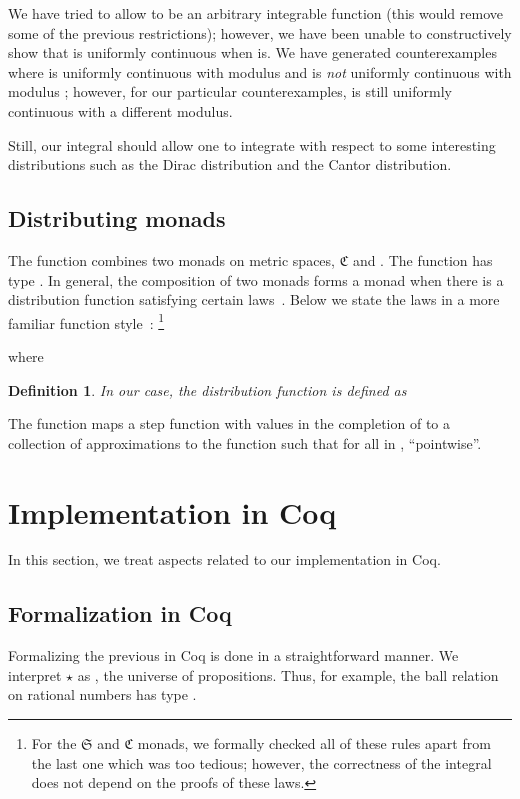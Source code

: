 \documentclass{elsarticle}
\newcommand{\op}[1]{#1}
\newcommand{\tmem}[1]{{\em #1\/}}
\newcommand{\tmtexttt}[1]{{\ttfamily{#1}}}
\newtheorem{definition}{Definition}
\newcommand{\C}{\ensuremath{\mathfrak{C}}}
\newcommand{\Prop}{\ensuremath{\op{\star}}}
\newcommand{\SF}{\ensuremath{\mathfrak{S}}}
\begin{document}
We have tried to allow  to be an arbitrary integrable function (this would
remove some of the previous restrictions); however, we have been unable to
constructively show that 
is uniformly continuous when  is. We have generated counterexamples where
 is uniformly continuous with modulus  and  is {\tmem{not}} uniformly continuous with
modulus ; however, for our particular counterexamples,
 is still uniformly
continuous with a different modulus.

Still, our integral should allow one to integrate with respect to some
interesting distributions such as the Dirac distribution
and the Cantor distribution.

\subsection{Distributing monads}\label{ss:dist-monad}The function
 combines two monads on metric
spaces, {\C} and
. The function  has type . In general, the composition of two monads
 forms a monad when there is a distribution
function  satisfying certain laws~{\cite{Beck:1969,TTT}}.
Below we state the laws in a more familiar function style~{\cite{Jones:1993}}:
{\footnote{For the {\SF} and {\C} monads, we formally checked all of these
rules apart from the last one which was too tedious; however, the correctness
of the integral does not depend on the proofs of these laws.}}

where

\begin{definition}
  \label{StepDist}In our case, the distribution function is defined as
  
\end{definition}

The function  maps a step function  with values in
the completion of  to a collection of approximations  to the function  such that for all  in
,  ``pointwise''.

\section{Implementation in Coq}

In this section, we treat aspects related to our implementation in Coq.

\subsection{Formalization in Coq}\label{ss:FIC}Formalizing the previous in Coq
is done in a straightforward manner. We interpret {\Prop} as
\tmtexttt{Prop}, the universe of propositions. Thus, for example, the ball
relation on rational numbers has type \tmtexttt{Qball : Qpos -> Q -> Q ->
Prop}.
\end{document}

